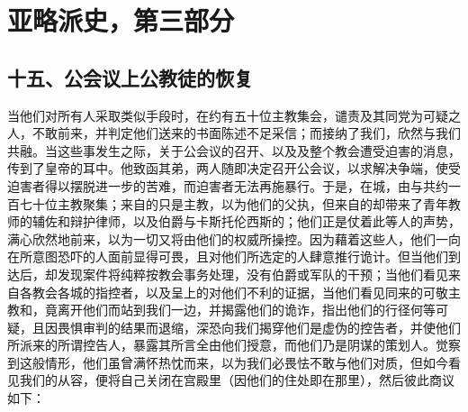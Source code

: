 
\section{亚略派史，第三部分}

\par


\subsection{十五、公会议上公教徒的恢复}

当他们对所有人采取类似手段时，在约有五十位主教集会，谴责及其同党为可疑之人，不敢前来，并判定他们送来的书面陈述不足采信；而接纳了我们，欣然与我们共融。当这些事发生之际，关于公会议的召开、以及及整个教会遭受迫害的消息，传到了皇帝的耳中。他致函其弟，两人随即决定召开公会议，以求解决争端，使受迫害者得以摆脱进一步的苦难，而迫害者无法再施暴行。于是，在城，由与共约一百七十位主教聚集；来自的只是主教，以为他们的父执，但来自的却带来了青年教师的辅佐和辩护律师，以及伯爵与卡斯托伦西斯的；他们正是仗着此等人的声势，满心欣然地前来，以为一切又将由他们的权威所操控。因为藉着这些人，他们一向在所意图恐吓的人面前显得可畏，且对他们所选定的人肆意推行诡计。但当他们到达后，却发现案件将纯粹按教会事务处理，没有伯爵或军队的干预；当他们看见来自各教会各城的指控者，以及呈上的对他们不利的证据，当他们看见同来的可敬主教和，竟离开他们而站到我们一边，并揭露他们的诡诈，指出他们的行径何等可疑，且因畏惧审判的结果而退缩，深恐向我们揭穿他们是虚伪的控告者，并使他们所派来的所谓控告人，暴露其所言全由他们授意，而他们乃是阴谋的策划人。觉察到这般情形，他们虽曾满怀热忱而来，以为我们必畏怯不敢与他们对质，但如今看见我们的从容，便将自己关闭在宫殿里（因他们的住处即在那里），然后彼此商议如下：\par

